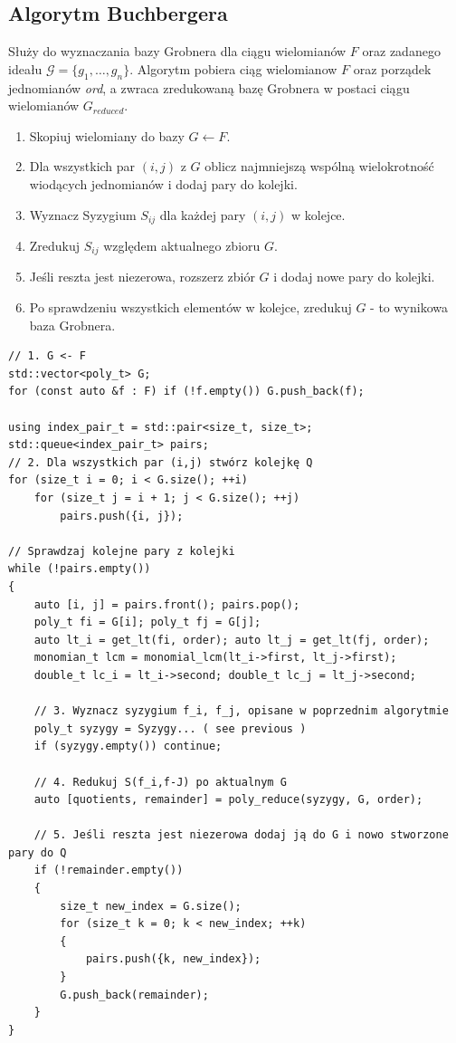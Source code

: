 \documentclass[10pt, a4paper]{article}
\begin{document}
\subsection{Algorytm Buchbergera}

Służy do wyznaczania bazy Grobnera dla ciągu wielomianów $F$ oraz zadanego ideału $\mathcal{G}=\{g_1,\dots,g_n\}$.
Algorytm pobiera ciąg wielomianow $F$ oraz porządek jednomianów \textit{ord},
 a zwraca zredukowaną bazę Grobnera w postaci ciągu wielomianów $G_{reduced}$.

\begin{enumerate}
    \item Skopiuj wielomiany do bazy $G\gets F$.
    \item Dla wszystkich par $(i,j)$ z $G$ oblicz najmniejszą wspólną wielokrotność wiodących jednomianów i dodaj pary do kolejki.
    \item Wyznacz Syzygium $S_{ij}$ dla każdej pary $(i,j)$ w kolejce.
    \item Zredukuj $S_{ij}$ względem aktualnego zbioru $G$.
    \item Jeśli reszta jest niezerowa, rozszerz zbiór $G$ i dodaj nowe pary do kolejki.
    \item Po sprawdzeniu wszystkich elementów w kolejce, zredukuj $G$ - to wynikowa baza Grobnera.
\end{enumerate}

\begin{lstlisting}
// 1. G <- F
std::vector<poly_t> G;
for (const auto &f : F) if (!f.empty()) G.push_back(f);

using index_pair_t = std::pair<size_t, size_t>;
std::queue<index_pair_t> pairs;
// 2. Dla wszystkich par (i,j) stwórz kolejkę Q
for (size_t i = 0; i < G.size(); ++i)
    for (size_t j = i + 1; j < G.size(); ++j)
        pairs.push({i, j});

// Sprawdzaj kolejne pary z kolejki
while (!pairs.empty())
{
    auto [i, j] = pairs.front(); pairs.pop();
    poly_t fi = G[i]; poly_t fj = G[j];
    auto lt_i = get_lt(fi, order); auto lt_j = get_lt(fj, order);
    monomian_t lcm = monomial_lcm(lt_i->first, lt_j->first);
    double_t lc_i = lt_i->second; double_t lc_j = lt_j->second;

    // 3. Wyznacz syzygium f_i, f_j, opisane w poprzednim algorytmie
    poly_t syzygy = Syzygy... ( see previous )
    if (syzygy.empty()) continue;

    // 4. Redukuj S(f_i,f-J) po aktualnym G
    auto [quotients, remainder] = poly_reduce(syzygy, G, order);

    // 5. Jeśli reszta jest niezerowa dodaj ją do G i nowo stworzone pary do Q
    if (!remainder.empty())
    {
        size_t new_index = G.size();
        for (size_t k = 0; k < new_index; ++k)
        {
            pairs.push({k, new_index});
        }
        G.push_back(remainder);
    }
}
\end{lstlisting}
\end{document}
